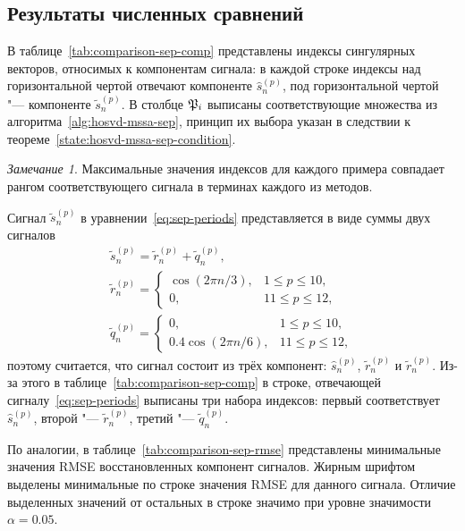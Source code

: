 \documentclass[specialist,
    substylefile=spbu.rtx,
    subf,href,colorlinks=true, 12pt]{disser}
\theoremstyle{plain}
\theoremstyle{definition}
\theoremstyle{remark}
\newtheorem*{remark}{Замечание}
\begin{document}
    \subsection{Результаты численных сравнений}\label{subsec:numerical-comp-sep}
    В таблице~\ref{tab:comparison-sep-comp} представлены индексы сингулярных векторов, относимых
    к компонентам сигнала: в каждой строке индексы над горизонтальной чертой отвечают компоненте $\hat{s}_n^{(p)}$,
    под горизонтальной чертой "--- компоненте $\tilde{s}_n^{(p)}$.
    В столбце $\mathfrak{P}_i$ выписаны соответствующие множества из алгоритма~\ref{alg:hosvd-mssa-sep},
    принцип их выбора указан в следствии к теореме~\ref{state:hosvd-mssa-sep-condition}.
    \begin{remark}
        Максимальные значения индексов для каждого примера совпадает рангом соответствующего сигнала в терминах
        каждого из методов.
    \end{remark}

    Сигнал $\tilde{s}_n^{(p)}$ в уравнении~\eqref{eq:sep-periods} представляется в виде суммы двух сигналов
    \begin{gather*}
        \tilde{s}_n^{(p)} = \tilde{r}_n^{(p)} + \tilde{q}_n^{(p)},\\
        \tilde{r}_n^{(p)} = \begin{cases}
            \cos(2\pi n /3), & 1 \leqslant p \leqslant 10,\\
            0, & 11 \leqslant p \leqslant 12,
        \end{cases} \\
        \tilde{q}_n^{(p)} = \begin{cases}
            0, & 1 \leqslant p \leqslant 10,\\
            0.4 \cos(2 \pi n / 6), & 11 \leqslant p \leqslant 12,
        \end{cases}
    \end{gather*}
    поэтому считается, что сигнал состоит из трёх компонент: $\hat{s}_n^{(p)}$, $\tilde{r}_n^{(p)}$ и
    $\tilde{r}_n^{(p)}$.
    Из-за этого в таблице~\ref{tab:comparison-sep-comp} в строке, отвечающей сигналу~\eqref{eq:sep-periods} выписаны
    три набора индексов: первый соответствует $\hat{s}_n^{(p)}$, второй "--- $\tilde{r}_n^{(p)}$,
    третий "--- $\tilde{q}_n^{(p)}$.

    По аналогии, в таблице~\ref{tab:comparison-sep-rmse} представлены минимальные значения RMSE восстановленных
    компонент сигналов.
    Жирным шрифтом выделены минимальные по строке значения RMSE для данного сигнала.
    Отличие выделенных значений от остальных в строке значимо при уровне значимости $\alpha=0.05$.
\end{document}
